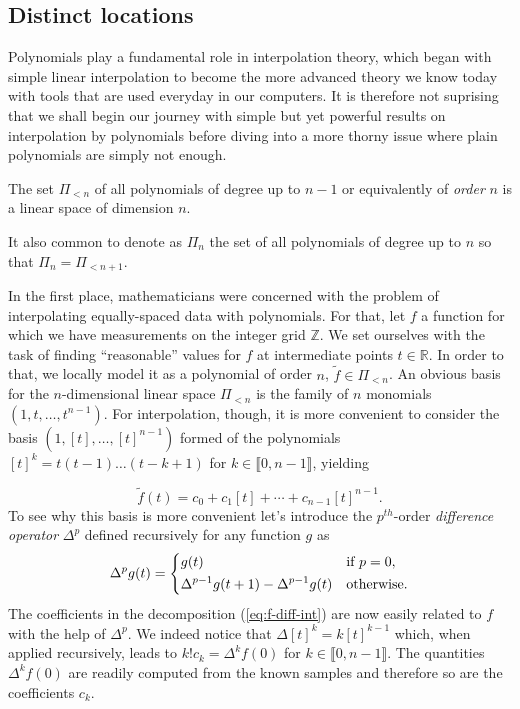 \subsection{Distinct locations}
Polynomials play a fundamental role in interpolation theory, which began with simple linear interpolation to become the 
more advanced theory we know today with tools that are used everyday in our computers. It is therefore not suprising 
that we shall begin our journey with simple but yet powerful results on interpolation by polynomials before diving into 
a more thorny issue where plain polynomials are simply not enough.

\begin{prop}
  The set $\Pi_{<n}$ of all polynomials of degree up to $n-1$ or equivalently of \emph{order} $n$ is a linear space of 
  dimension $n$.
\end{prop}

\begin{remark}
  It also common to denote as $\Pi_{n}$ the set of all polynomials of degree up to $n$ so that $\Pi_{n} = \Pi_{<n+1}$.
\end{remark}

In the first place, mathematicians were concerned with the problem of interpolating equally-spaced data with 
polynomials.  For that, let $f$ a function for which we have measurements on the integer grid $\mathbb{Z}$. We set 
ourselves with the task of finding ``reasonable'' values for $f$ at intermediate points $t \in \mathbb{R}$. In order to 
that, we locally model it as a polynomial of order $n$, $\tilde{f} \in \Pi_{<n}$.  An obvious basis for the 
$n$-dimensional linear space $\Pi_{<n}$ is the family of $n$ monomials $(1, t, \ldots, t^{n-1})$. For interpolation, 
though, it is more convenient to consider the basis $(1, [t], \ldots, {[t]}^{n-1})$ formed of the polynomials ${[t]}^k = 
t(t-1)\ldots(t-k+1)$ for $k \in \llbracket0,n-1\rrbracket$, yielding

\begin{equation}
  \label{eq:f-diff-int}
  \tilde{f}(t) = c_0 + c_1[t] + \cdots + c_{n-1} {[t]}^{n-1}.
\end{equation}
To see why this basis is more convenient let's introduce the $p^{th}$-order \emph{difference operator} $\Delta^p$ 
defined recursively for any function $g$ as
\begin{equation}\label{eq:def-Delta}
  \Delta^p g(t)=
  \begin{dcases}
    g(t) & \text{if} \ p=0,\\
    \Delta^{p-1}g(t+1) - \Delta^{p-1}g(t) & \text{otherwise}.
  \end{dcases}
\end{equation}
The coefficients in the decomposition (\ref{eq:f-diff-int}) are now easily related to $f$ with the help of $\Delta^p$.  
We indeed notice that $\Delta{[t]}^k = k{[t]}^{k-1}$ which, when applied recursively, leads to $k!  c_k =\Delta^k f(0)$ 
for $k\in \llbracket0,n-1\rrbracket$. The quantities $\Delta^k f(0)$ are readily computed from the known samples and 
therefore so are the coefficients $c_k$. \\

